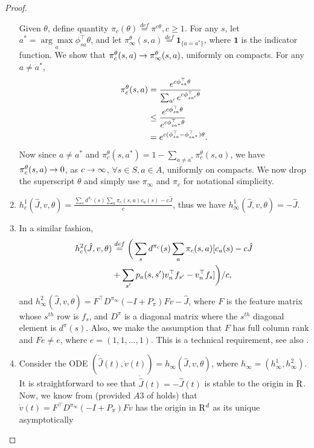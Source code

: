 \begin{proof}
\begin{enumerate}
\indent
Given $\theta$, define quantity $\pi_c(\theta)\stackrel{def}{=}\pi^{c\theta}, c \geq 1$. For any $s$, let $a^*=\underset{a}{\arg\max} \phi^\top_{sa}\theta$, and let $\pi^\theta_\infty(s,a)\stackrel{def}{=}\mathbf{1}_{\{a=a^*\}}$, where $\mathbf{1}$ is the indicator function. We show that $\pi_c^\theta(s,a) \rightarrow \pi^\theta_\infty(s,a)$, uniformly on compacts. For any $a\neq a^*$,
\begin{align}
\pi_c^\theta(s,a)&=\frac{e^{c\phi^\top_{sa}\theta}}{\sum_{a'}e^{c\phi^\top_{sa'} \theta}}\nonumber\\
 &\leq \frac{e^{c\phi^\top_{sa}\theta}}{e^{c\phi^\top_{sa^*} \theta}}\nonumber\\
&=e^{c(\phi^\top_{sa}-\phi^\top_{sa^*}) \theta}.\nonumber
\end{align}
Now since $a\neq a^*$ and $\pi^\theta_c(s,a^*)=1-\sum_{a\neq a^*} \pi^\theta_c(s,a)$, we have 
$\pi^\theta_c(s,a)\rightarrow 0$, as $c \rightarrow \infty$, $\forall s \in S, a \in A$, uniformly on compacts. We now
drop the superscript $\theta$ and simply use $\pi_\infty$ and $\pi_c$ for notational simplicity.
\item $h_c^1(\hat{J},v,\theta)=\frac{\sum_s d^{\pi_c}(s)\sum_a \pi_c(s,a)c_a(s)-c\hat{J}}{c}$, thus we have 
$h^1_\infty(\hat{J},v,\theta)=-\hat{J}$.
\item In a similar fashion, 
\begin{align}
h^2_c(\hat{J},v,\theta)&\stackrel{def}{=}\bigg(\sum_s d^{\pi_c}(s)\sum_a \pi_c(s,a)[c_a(s)-c\hat{J}\nonumber\\&+\sum_{s'}p_a(s,s') v^\top_nf_{s'}-v^\top_nf_s]\bigg)/{c},\nonumber
\end{align}
and $h^2_\infty(\hat{J},v,\theta)=F^\top D^{\pi_\infty}(-I+P_\pi)Fv -\hat{J}$, where $F$ is the feature matrix whose $s^{th}$ row is $f_s$, and $D^\pi$ is a diagonal matrix where the $s^{th}$ diagonal element is 
$d^\pi(s)$. Also, we make the assumption that $F$ has full column rank and $Fe\neq e$, where 
$e=(1,1,\ldots,1)$. This is a technical requirement, see also \cite{NAC,sitavg}.
\item Consider the ODE $(\dot{\hat{J}}(t),\dot{v}(t))=h_\infty(\hat{J},v,\theta)$, where 
$h_\infty=(h^1_\infty,h^2_\infty)$. It is straightforward to see that $\dot{\hat{J}}(t)=-\hat{J}(t)$ is 
stable to the origin in $\mathrm{R}$. Now, we know from \cite{NAC} (provided ${A3}$ of \cite{NAC} holds) that 
$\dot{v}(t)=F^\top D^{\pi_\infty}(-I+P_\pi)Fv$ has the origin in $\mathrm{R}^d$ as its unique asymptotically 

\end{enumerate}
\end{proof}
